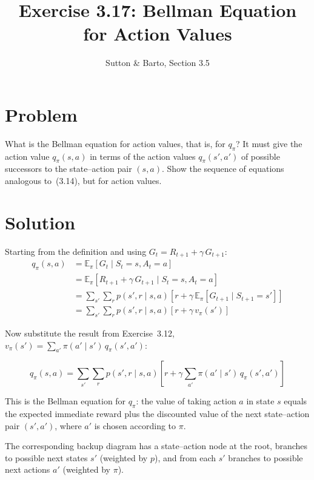 \documentclass[11pt]{article}
\title{Exercise 3.17: Bellman Equation for Action Values}
\author{Sutton \& Barto, Section 3.5}
\date{}
\begin{document}
\maketitle

\section*{Problem}

What is the Bellman equation for action values, that is, for $q_\pi$? It must
give the action value $q_\pi(s, a)$ in terms of the action values
$q_\pi(s', a')$ of possible successors to the state--action pair $(s, a)$.
Show the sequence of equations analogous to~(3.14), but for action values.

\section*{Solution}

Starting from the definition and using $G_t = R_{t+1} + \gamma\, G_{t+1}$:
\begin{align*}
    q_\pi(s, a)
    &= \mathbb{E}_\pi[G_t \mid S_t = s, A_t = a] \\[6pt]
    &= \mathbb{E}_\pi[R_{t+1} + \gamma\, G_{t+1} \mid S_t = s, A_t = a] \\[6pt]
    &= \sum_{s'} \sum_{r} p(s', r \mid s, a)
       \left[ r + \gamma\, \mathbb{E}_\pi[G_{t+1} \mid S_{t+1} = s'] \right] \\[6pt]
    &= \sum_{s'} \sum_{r} p(s', r \mid s, a)
       \left[ r + \gamma\, v_\pi(s') \right]
\end{align*}

Now substitute the result from Exercise~3.12, $v_\pi(s') = \sum_{a'} \pi(a' \mid s')\, q_\pi(s', a')$:

\[
    \boxed{q_\pi(s, a) = \sum_{s'} \sum_{r} p(s', r \mid s, a)
    \left[ r + \gamma \sum_{a'} \pi(a' \mid s')\, q_\pi(s', a') \right]}
\]

This is the Bellman equation for $q_\pi$: the value of taking action $a$ in
state $s$ equals the expected immediate reward plus the discounted value of
the next state--action pair $(s', a')$, where $a'$ is chosen according to $\pi$.

The corresponding backup diagram has a state--action node at the root,
branches to possible next states $s'$ (weighted by $p$), and from each $s'$
branches to possible next actions $a'$ (weighted by $\pi$).
\end{document}

